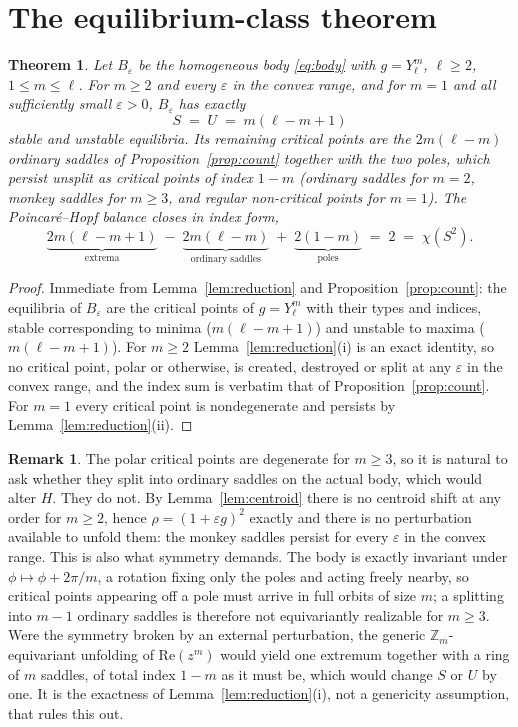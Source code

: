 \documentclass[11pt,a4paper]{article}
\newtheorem{theorem}{Theorem}
\theoremstyle{definition}
\newtheorem{remark}{Remark}
\begin{document}
\section{The equilibrium-class theorem}

\begin{theorem}\label{thm:main}
Let $B_\varepsilon$ be the homogeneous body \eqref{eq:body} with $g=Y_\ell^m$, $\ell\ge2$, $1\le m\le\ell$.
For $m\ge2$ and \emph{every} $\varepsilon$ in the convex range, and for $m=1$ and all sufficiently small
$\varepsilon>0$, $B_\varepsilon$ has exactly
\[
S \;=\; U \;=\; m(\ell-m+1)
\]
stable and unstable equilibria. Its remaining critical points are the $2m(\ell-m)$ ordinary saddles of
Proposition~\ref{prop:count} together with the two poles, which persist \emph{unsplit} as critical points of
index $1-m$ (ordinary saddles for $m=2$, monkey saddles for $m\ge3$, and regular non-critical points for
$m=1$). The Poincar\'e--Hopf balance closes in index form,
\[
\underbrace{2m(\ell-m+1)}_{\text{extrema}}\;-\;\underbrace{2m(\ell-m)}_{\text{ordinary saddles}}\;+\;
\underbrace{2(1-m)}_{\text{poles}}\;=\;2\;=\;\chi(S^2).
\]
\end{theorem}
\begin{proof}
Immediate from Lemma~\ref{lem:reduction} and Proposition~\ref{prop:count}: the equilibria of $B_\varepsilon$
are the critical points of $g=Y_\ell^m$ with their types and indices, stable corresponding to minima
($m(\ell-m+1)$) and unstable to maxima ($m(\ell-m+1)$). For $m\ge2$ Lemma~\ref{lem:reduction}(i) is an exact
identity, so no critical point, polar or otherwise, is created, destroyed or split at any $\varepsilon$ in the
convex range, and the index sum is verbatim that of Proposition~\ref{prop:count}. For $m=1$ every critical
point is nondegenerate and persists by Lemma~\ref{lem:reduction}(ii).
\end{proof}

\begin{remark}\label{rem:nosplit}
The polar critical points are degenerate for $m\ge3$, so it is natural to ask whether they split into ordinary
saddles on the actual body, which would alter $H$. They do not. By Lemma~\ref{lem:centroid} there is no
centroid shift at any order for $m\ge2$, hence $\rho=(1+\varepsilon g)^2$ exactly and there is no perturbation
available to unfold them: the monkey saddles persist for every $\varepsilon$ in the convex range. This is also
what symmetry demands. The body is exactly invariant under $\phi\mapsto\phi+2\pi/m$, a rotation fixing only
the poles and acting freely nearby, so critical points appearing off a pole must arrive in full orbits of size
$m$; a splitting into $m-1$ ordinary saddles is therefore not equivariantly realizable for $m\ge3$. Were the
symmetry broken by an external perturbation, the generic $\mathbb{Z}_m$-equivariant unfolding of
$\mathrm{Re}(z^m)$ would yield one extremum together with a ring of $m$ saddles, of total index $1-m$ as it
must be, which would change $S$ or $U$ by one. It is the exactness of Lemma~\ref{lem:reduction}(i), not a
genericity assumption, that rules this out.
\end{remark}
\end{document}
